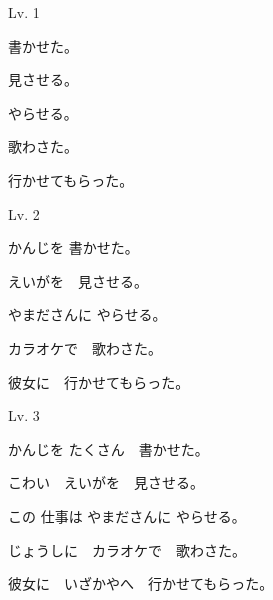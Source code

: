 	
	\begin{mondai}{Lv. 1}
		\item 書かせた。
		\item 見させる。
		\item やらせる。
		\item 歌わさた。
		\item 行かせてもらった。
	\end{mondai}

	\begin{mondai}{Lv. 2}
		\item かんじを 書かせた。
		\item えいがを　見させる。
		\item やまださんに やらせる。
		\item カラオケで　歌わさた。
		\item 彼女に　行かせてもらった。
	\end{mondai}

	\begin{mondai}{Lv. 3}
		\item かんじを たくさん　書かせた。
		\item こわい　えいがを　見させる。
		\item この 仕事は やまださんに やらせる。
		\item じょうしに　カラオケで　歌わさた。
		\item 彼女に　いざかやへ　行かせてもらった。
	\end{mondai}

